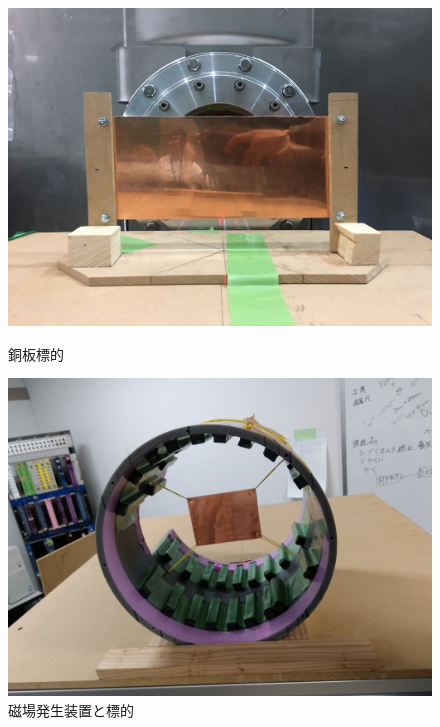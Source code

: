 \begin{figure}[H]
\begin{minipage}{0.45\hsize}
\begin{center}
\includegraphics[width=1\textwidth]{figure/tajima/cu_target.jpg}
\caption{銅板標的}
\label{tar_cu}
\end{center}
\end{minipage}
\hfill
\begin{minipage}{0.45\hsize}
\begin{center}
\includegraphics[width=1\textwidth]{figure/tajima/mag.jpg}
\caption{磁場発生装置と標的 \protect\footnotemark}
\label{tar_mag}
\end{center}
\end{minipage}
\end{figure}

